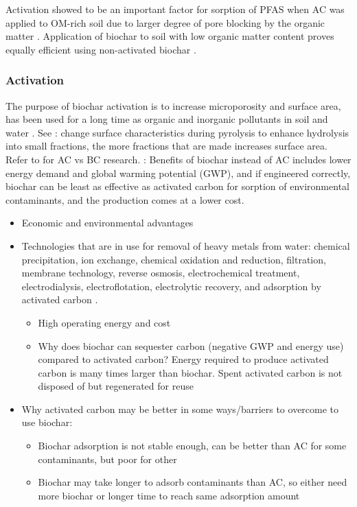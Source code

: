 Activation showed to be an important factor for sorption of PFAS when AC was applied to OM-rich soil due to larger degree of pore blocking by the organic matter \citep{Sormo2021}. Application of biochar to soil with low organic matter content proves equally efficient using non-activated biochar \citep{Alhashimi2017}. 

\subsubsection{Activation}
The purpose of biochar activation is to increase microporosity and surface area, has been used for a long time as organic and inorganic pollutants in soil and water \citep{Ahmad2014}. 
See \citep{Li2019}: change surface characteristics during pyrolysis to enhance hydrolysis into small fractions, the more fractions that are made increases surface area. 
Refer to \citep{Li2019} for AC vs BC research. 
\citep{Alhashimi2017}: Benefits of biochar instead of AC includes lower energy demand and global warming potential (GWP), and if engineered correctly, biochar can be least as effective as activated carbon for sorption of environmental contaminants, and the production comes at a lower cost. 

\begin{itemize}
\item Economic and environmental advantages
\item Technologies that are in use for removal of heavy metals from water: chemical precipitation, ion exchange, chemical oxidation and reduction, filtration, membrane technology, reverse osmosis, electrochemical treatment, electrodialysis, electroflotation, electrolytic recovery, and adsorption by activated carbon \citep{schroder2010,du2014adsorption}. 
\begin{itemize}
\item High operating energy and cost
\item Why does biochar can sequester carbon (negative GWP and energy use) compared to activated carbon? Energy required to produce activated carbon is many times larger than biochar. Spent activated carbon is not disposed of but regenerated for reuse
\end{itemize}
\item Why activated carbon may be better in some ways/barriers to overcome to use biochar:
\begin{itemize}
\item Biochar adsorption is not stable enough, can be better than AC for some contaminants, but poor for other
\item Biochar may take longer to adsorb contaminants than AC, so either need more biochar or longer time to reach same adsorption amount
\end{itemize}
\end{itemize}

